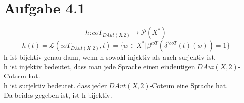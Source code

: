 \section*{Aufgabe 4.1}
\[h:coT_{DAut(X.2)}\rightarrow\mathcal{P}(X^*)\]
\[ h(t)=\mathcal{L}(coT_{DAut(X,2)},t)=\{w\in X^*|\beta^{coT}(\delta^{*coT}(t)(w))=1\}\]
h ist bijektiv genau dann, wenn h sowohl injektiv als auch surjektiv ist.\\
h ist injektiv bedeutet, dass man jede Sprache einen eindeutigen $DAut(X,2)$-Coterm hat.\\
h ist surjektiv bedeutet. dass jeder $DAut(X,2)$-Coterm eine Sprache hat.\\
Da beides gegeben ist, ist h bijektiv.
